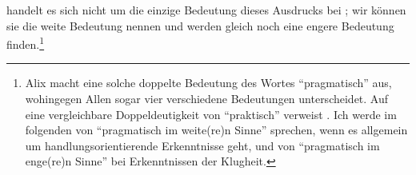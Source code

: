 handelt es sich nicht um die einzige Bedeutung dieses Ausdrucks bei
; wir können sie die weite Bedeutung nennen und werden
gleich noch eine engere Bedeutung
finden.\footnote{\label{Fussnote:DoppelteBedeutungvonPragmatisch}Alix
\textcite[][69]{Cohen:KantandtheHumanSciences2009} macht eine solche doppelte
Bedeutung des Wortes \enquote{pragmatisch} aus, wohingegen Allen
\textcite[39--42]{Wood:KantandtheProblemofHumanNature2003} sogar vier
verschiedene Bedeutungen unterscheidet. Auf eine vergleichbare Doppeldeutigkeit
von \enquote{praktisch} verweist
\textcite[vgl.][77]{Louden:TheSecondPartofMorals2003}. Ich werde im folgenden
von \enquote{pragmatisch im weite(re)n Sinne} sprechen, wenn es allgemein um
handlungsorientierende Erkenntnisse geht, und von \enquote{pragmatisch im
enge(re)n Sinne} bei Erkenntnissen der Klugheit.}



